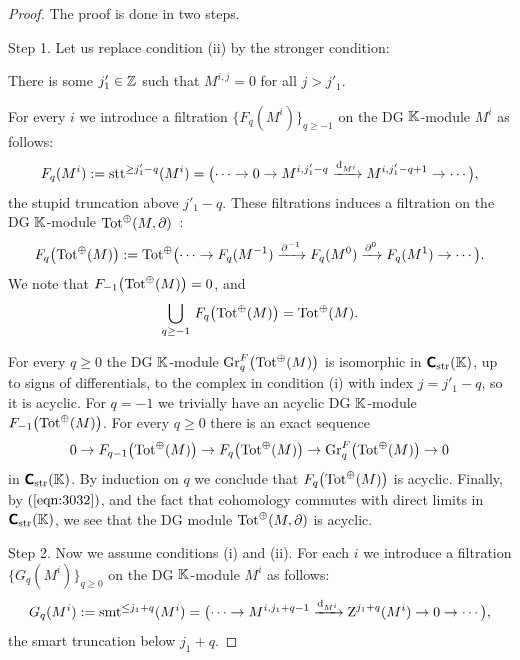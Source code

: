 \begin{proof} The proof is done in two steps. 

\smallskip \noindent
Step 1. Let us replace condition (ii) by the stronger condition: 
\begin{itemize}
 There is some $j'_1 \in \mathbb{Z}$ such that 
$M^{i, j} = 0$ for all $j > j'_1$. 
\end{itemize}
For every $i$ we introduce a filtration 
$\{ F_q(M^i) \}_{q \geq -1}$
on the DG $\mathbb{K}$-module $M^i$ as follows: 
\[ F_q (M^i) := \operatorname{stt}^{\geq j'_1 - q}(M^i)
= \bigl( \cdots \to 0 \to M^{i, j_1' - q} \xrightarrow{\mathrm{d}_{M^i}} M^{i, j'_1 - q + 1} 
\to \cdots \bigr) , \]
the stupid truncation above $j'_1 - q$. 
These filtrations induces a filtration on the DG $\mathbb{K}$-module 
$\operatorname{Tot}^{\oplus}(M, \partial)$~: 
\[ F_q \bigl( \operatorname{Tot}^{\oplus}(M) \bigr) := 
\operatorname{Tot}^{\oplus} 
\bigl( \cdots \to F_q(M^{-1}) \xrightarrow{\partial^{-1}}
F_q(M^{0}) \xrightarrow{\partial^{0}} F_q(M^{1}) \to \cdots \bigr) . \]
We note that $F_{-1} \bigl( \operatorname{Tot}^{\oplus}(M) \bigr) = 0$, and 
\begin{equation} \label{eqn:3032}
\bigcup_{q \geq -1} \, F_q \bigl( \operatorname{Tot}^{\oplus}(M) \bigr) = 
\operatorname{Tot}^{\oplus}(M) . 
\end{equation}

For every $q \geq 0$ the DG $\mathbb{K}$-module 
$\operatorname{Gr}^F_q \bigl( \operatorname{Tot}^{\oplus}(M) \bigr)$
is isomorphic in $\boldsymbol{\mathsf{C}}_{\mathrm{str}}(\mathbb{K})$, up to signs of differentials, to 
the complex in condition (i) 
with index $j = j'_1 - q$, so it is acyclic. For $q = -1$ 
we trivially have an acyclic DG $\mathbb{K}$-module 
$F_{-1} \bigl( \operatorname{Tot}^{\oplus}(M) \bigr)$. 
For every $q \geq 0$ there is an exact sequence 
\[ 0 \to F_{q - 1} \bigl( \operatorname{Tot}^{\oplus}(M) \bigr) \to 
F_q \bigl( \operatorname{Tot}^{\oplus}(M) \bigr) \to 
\operatorname{Gr}^F_q \bigl( \operatorname{Tot}^{\oplus}(M) \bigr) \to 0 \]
in $\boldsymbol{\mathsf{C}}_{\mathrm{str}}(\mathbb{K})$. By induction on $q$ we conclude that 
$F_q \bigl( \operatorname{Tot}^{\oplus}(M) \bigr)$
is acyclic. Finally, by $(\ref{eqn:3032})$, and the fact that cohomology 
commutes with direct limits in $\boldsymbol{\mathsf{C}}_{\mathrm{str}}(\mathbb{K})$, we see that the DG 
module $\operatorname{Tot}^{\oplus}(M, \partial)$ is acyclic. 

\medskip \noindent 
Step 2. Now we assume conditions (i) and (ii). 
For each $i$ we introduce a filtration 
$\{ G_q(M^i) \}_{q \geq 0}$
on the DG $\mathbb{K}$-module $M^i$ as follows: 
\[ G_q(M^i) := \operatorname{smt}^{\leq j_1 + q}(M^i) = 
\bigl( \cdots \to M^{i, j_1 + q - 1} \xrightarrow{\mathrm{d}_{M^i}} 
\operatorname{Z}^{j_1 + q}(M^i) \to 0 \to  \cdots \bigr) , \]
the smart truncation below $j_1 + q$. 


\end{proof}
